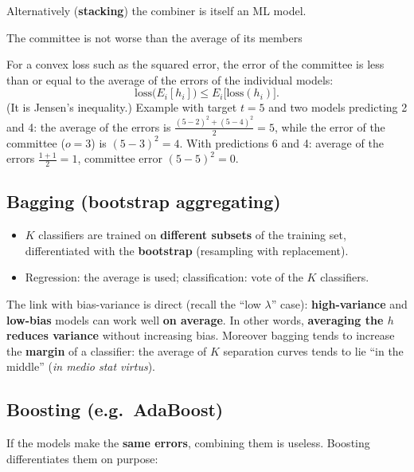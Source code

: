 Alternatively (\textbf{stacking}) the combiner is itself an ML model.

\begin{boxtheorem}{The committee is not worse than the average of its members}

For a convex loss such as the squared error, the error of the committee
is less than or equal to the average of the errors of the individual
models: \[
\text{loss}\big(E_i[h_i]\big) \le E_i\big[\text{loss}(h_i)\big].
\] (It is Jensen's inequality.) Example with target \(t = 5\) and two
models predicting 2 and 4: the average of the errors is
\(\frac{(5-2)^2 + (5-4)^2}{2} = 5\), while the error of the committee
(\(o = 3\)) is \((5-3)^2 = 4\). With predictions 6 and 4: average of
the errors \(\frac{1 + 1}{2} = 1\), committee error \((5-5)^2 = 0\).

\end{boxtheorem}

\subsection{Bagging (bootstrap
aggregating)}\label{bagging-bootstrap-aggregating}

\begin{itemize}
\tightlist
\item
  \(K\) classifiers are trained on \textbf{different subsets} of the
  training set, differentiated with the \textbf{bootstrap} (resampling
  with replacement).
\item
  Regression: the average is used; classification: vote of the \(K\)
  classifiers.
\end{itemize}

The link with bias-variance is direct (recall the ``low \(\lambda\)''
case): \textbf{high-variance} and \textbf{low-bias} models can work
well \textbf{on average}. In other words, \textbf{averaging the \(h\)
reduces variance} without increasing bias. Moreover bagging tends to
increase the \textbf{margin} of a classifier: the average of \(K\)
separation curves tends to lie ``in the middle'' (\emph{in medio stat
virtus}).

\subsection{Boosting (e.g.\ AdaBoost)}\label{boosting-es.-adaboost}

If the models make the \textbf{same errors}, combining them is useless.
Boosting differentiates them on purpose:


